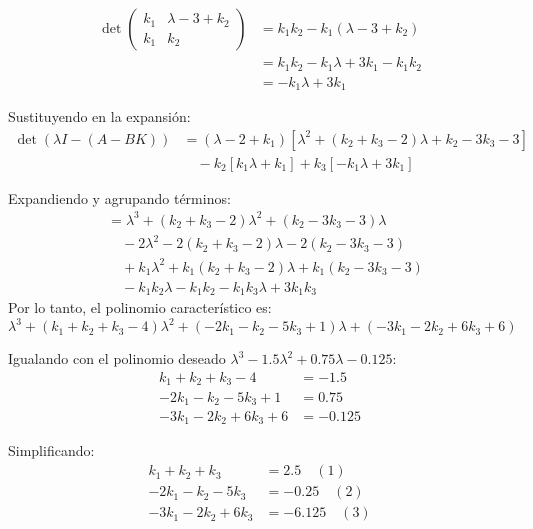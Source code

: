 \documentclass[
  11pt,
  letterpaper,
   addpoints,
   answers
  ]{exam}
\begin{document}
\begin{questions}
\begin{parts}
\begin{solution}
        \begin{align}
            \det\begin{pmatrix} k_1 & \lambda-3+k_2\\ k_1 & k_2 \end{pmatrix} &= k_1k_2 - k_1(\lambda-3+k_2)\\
            &= k_1k_2 - k_1\lambda + 3k_1 - k_1k_2\\
            &= -k_1\lambda + 3k_1
        \end{align}

        Sustituyendo en la expansión:
        \begin{align}
            \det(\lambda I - (A-BK)) &= (\lambda-2+k_1)[\lambda^2 + (k_2+k_3-2)\lambda + k_2 - 3k_3 - 3]\nonumber\\
            &\quad - k_2[k_1\lambda + k_1] + k_3[-k_1\lambda + 3k_1]
        \end{align}

        Expandiendo y agrupando términos:
        \begin{align}
            &= \lambda^3 + (k_2+k_3-2)\lambda^2 + (k_2-3k_3-3)\lambda\nonumber\\
            &\quad - 2\lambda^2 - 2(k_2+k_3-2)\lambda - 2(k_2-3k_3-3)\nonumber\\
            &\quad + k_1\lambda^2 + k_1(k_2+k_3-2)\lambda + k_1(k_2-3k_3-3)\nonumber\\
            &\quad - k_1k_2\lambda - k_1k_2 - k_1k_3\lambda + 3k_1k_3
        \end{align}
        Por lo tanto, el polinomio característico es:
        \begin{equation}
            \lambda^3 + (k_1+k_2+k_3-4)\lambda^2 + (-2k_1-k_2-5k_3+1)\lambda + (-3k_1-2k_2+6k_3+6)
        \end{equation}

        Igualando con el polinomio deseado $\lambda^3 - 1.5\lambda^2 + 0.75\lambda - 0.125$:
        \begin{align}
            k_1+k_2+k_3-4 &= -1.5\\
            -2k_1-k_2-5k_3+1 &= 0.75\\
            -3k_1-2k_2+6k_3+6 &= -0.125
        \end{align}

        Simplificando:
        \begin{align}
            k_1+k_2+k_3 &= 2.5 \quad (1)\\
            -2k_1-k_2-5k_3 &= -0.25 \quad (2)\\
            -3k_1-2k_2+6k_3 &= -6.125 \quad (3)
        \end{align}


\end{solution}
\end{parts}
\end{questions}
\end{document}
